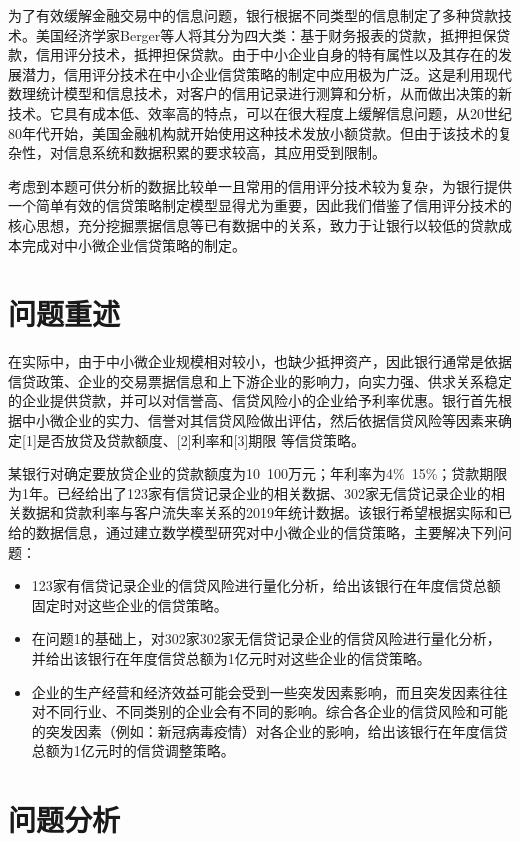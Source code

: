 \documentclass{cumcmthesis}
\begin{document}
为了有效缓解金融交易中的信息问题，银行根据不同类型的信息制定了多种贷款技术。美国经济学家Berger等人将其分为四大类：基于财务报表的贷款，抵押担保贷款，信用评分技术，抵押担保贷款。由于中小企业自身的特有属性以及其存在的发展潜力，信用评分技术在中小企业信贷策略的制定中应用极为广泛。这是利用现代数理统计模型和信息技术，对客户的信用记录进行测算和分析，从而做出决策的新技术。它具有成本低、效率高的特点，可以在很大程度上缓解信息问题，从20世纪80年代开始，美国金融机构就开始使用这种技术发放小额贷款。但由于该技术的复杂性，对信息系统和数据积累的要求较高，其应用受到限制。		

考虑到本题可供分析的数据比较单一且常用的信用评分技术较为复杂，为银行提供一个简单有效的信贷策略制定模型显得尤为重要，因此我们借鉴了信用评分技术的核心思想，充分挖掘票据信息等已有数据中的关系，致力于让银行以较低的贷款成本完成对中小微企业信贷策略的制定。


\section{问题重述}

在实际中，由于中小微企业规模相对较小，也缺少抵押资产，因此银行通常是依据信贷政策、企业的交易票据信息和上下游企业的影响力，向实力强、供求关系稳定的企业提供贷款，并可以对信誉高、信贷风险小的企业给予利率优惠。银行首先根据中小微企业的实力、信誉对其信贷风险做出评估，然后依据信贷风险等因素来确定[1]是否放贷及贷款额度、[2]利率和[3]期限 等信贷策略。

某银行对确定要放贷企业的贷款额度为10~100万元；年利率为4\%~15\%；贷款期限为1年。已经给出了123家有信贷记录企业的相关数据、302家无信贷记录企业的相关数据和贷款利率与客户流失率关系的2019年统计数据。该银行希望根据实际和已给的数据信息，通过建立数学模型研究对中小微企业的信贷策略，主要解决下列问题：
\begin{itemize}
    \item 123家有信贷记录企业的信贷风险进行量化分析，给出该银行在年度信贷总额固定时对这些企业的信贷策略。
    \item 在问题1的基础上，对302家302家无信贷记录企业的信贷风险进行量化分析，并给出该银行在年度信贷总额为1亿元时对这些企业的信贷策略。
    \item 企业的生产经营和经济效益可能会受到一些突发因素影响，而且突发因素往往对不同行业、不同类别的企业会有不同的影响。综合各企业的信贷风险和可能的突发因素（例如：新冠病毒疫情）对各企业的影响，给出该银行在年度信贷总额为1亿元时的信贷调整策略。
\end{itemize}

\section{问题分析}
\end{document}
